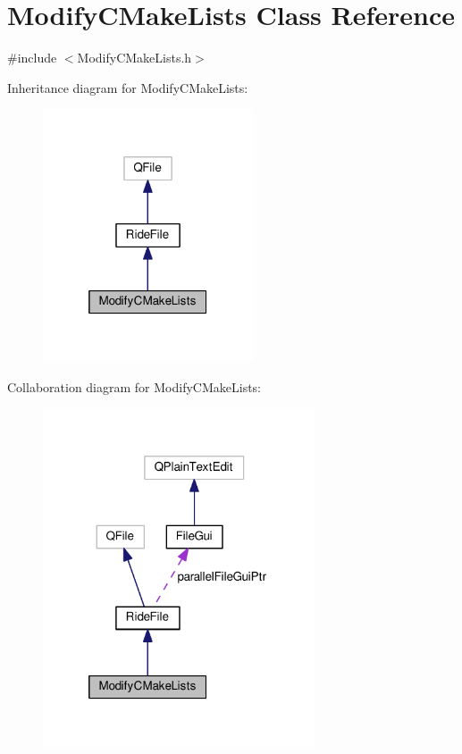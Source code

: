 \hypertarget{class_modify_c_make_lists}{\section{Modify\-C\-Make\-Lists Class Reference}
\label{class_modify_c_make_lists}
}


{\ttfamily \#include $<$Modify\-C\-Make\-Lists.\-h$>$}



Inheritance diagram for Modify\-C\-Make\-Lists\-:
\nopagebreak
\begin{figure}[H]
\begin{center}
\leavevmode
\includegraphics[width=176pt]{class_modify_c_make_lists__inherit__graph}
\end{center}
\end{figure}


Collaboration diagram for Modify\-C\-Make\-Lists\-:
\nopagebreak
\begin{figure}[H]
\begin{center}
\leavevmode
\includegraphics[width=228pt]{class_modify_c_make_lists__coll__graph}
\end{center}
\end{figure}
